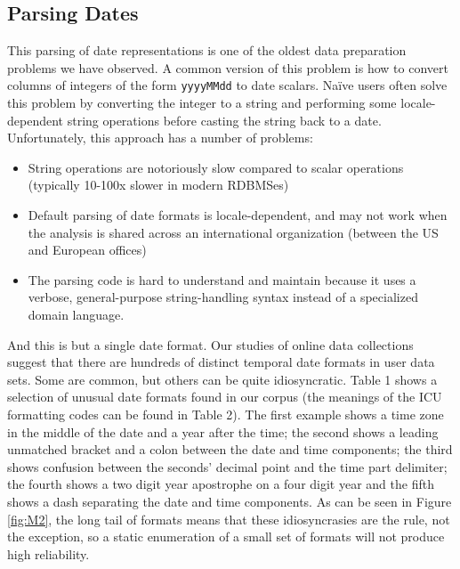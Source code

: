 \subsection{Parsing Dates}
This parsing of date representations is one of the oldest data preparation problems we have observed. A common version of this problem is how to convert columns of integers of the form \texttt{yyyyMMdd} to date scalars. Na\"{i}ve users often solve this problem by converting the integer to a string and performing some locale-dependent string operations before casting the string back to a date. Unfortunately, this approach has a number of problems:
\begin{itemize}
\item String operations are notoriously slow compared to scalar operations (typically 10-100x slower in modern RDBMSes)
\item Default parsing of date formats is locale-dependent, and may not work when the analysis is shared across an international organization (\eg between the US and European offices)
\item The parsing code is hard to understand and maintain because it uses a verbose, general-purpose string-handling syntax instead of a specialized domain language.
\end{itemize}

And this is but a single date format. Our studies of online data collections suggest that there are hundreds of distinct temporal date formats in user data sets. Some are common, but others can be quite idiosyncratic. Table 1 shows a selection of unusual date formats found in our corpus (the meanings of the ICU formatting codes can be found in Table 2). The first example shows a time zone in the middle of the date and a year after the time; the second shows a leading unmatched bracket and a colon between the date and time components; the third shows confusion between the seconds' decimal point and the time part delimiter; the fourth shows a two digit year apostrophe on a four digit year and the fifth shows a dash separating the date and time components. 
As can be seen in Figure \ref{fig:M2}, the long tail of formats means that these idiosyncrasies are the rule, not the exception, 
so a static enumeration of a small set of formats will not produce high reliability.


